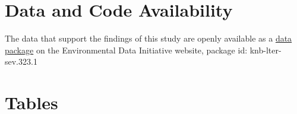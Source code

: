 \documentclass[11pt]{article}
\begin{document}

\section*{Data and Code Availability}
The data that support the findings of this study are openly available as a \href{https://portal.edirepository.org/nis/mapbrowse?packageid=knb-lter-sev.323.1}{data package} on the Environmental Data Initiative website, package id: knb-lter-sev.323.1


\renewcommand{\theequation}{A\arabic{equation}}
\renewcommand{\thetable}{A\arabic{table}}
\setcounter{equation}{0}  %
\setcounter{figure}{0}
\setcounter{table}{0}

%
%




\newpage{}

\section*{Tables}
\renewcommand{\thetable}{\arabic{table}}
\setcounter{table}{0}

\renewcommand{\thetable}{\arabic{table}}
\setcounter{table}{0}
\end{document}
